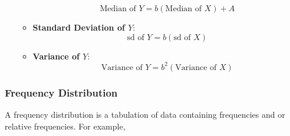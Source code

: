 \documentclass{report}
\begin{document}
\begin{itemize}
\begin{itemize}
                    \[
                        \text{Median of } Y = b (\text{Median of } X) + A
                    \]
                \item \textbf{Standard Deviation of \( Y \)}: 
                    \[
                        \text{sd of } Y = b (\text{sd of } X)
                    \]
                \item \textbf{Variance of \( Y \)}: 
                    \[
                        \text{Variance of } Y = b^2 (\text{Variance of } X)
                    \]
            \end{itemize}






\end{itemize}

\pagebreak 
\subsubsection{Frequency Distribution}
\bigbreak \noindent 
A frequency distribution is a tabulation of data containing frequencies and or relative frequencies. For example,
\bigbreak \noindent 
{}


\pagebreak 
\end{document}
